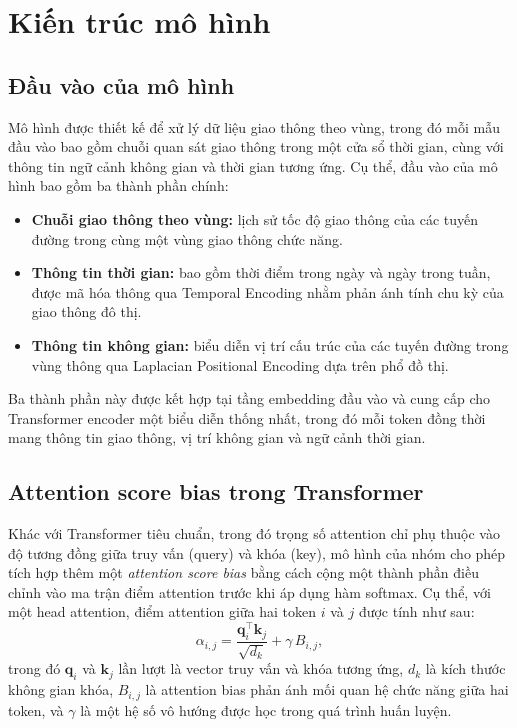 \section{Kiến trúc mô hình}
\label{sec:model}

\subsection{Đầu vào của mô hình}
\label{subsec:model_input}

Mô hình được thiết kế để xử lý dữ liệu giao thông theo vùng, trong đó mỗi mẫu đầu vào bao gồm
chuỗi quan sát giao thông trong một cửa sổ thời gian, cùng với thông tin ngữ cảnh không gian
và thời gian tương ứng. Cụ thể, đầu vào của mô hình bao gồm ba thành phần chính:

\begin{itemize}
    \item \textbf{Chuỗi giao thông theo vùng:} lịch sử tốc độ giao thông của các tuyến đường
    trong cùng một vùng giao thông chức năng.
    \item \textbf{Thông tin thời gian:} bao gồm thời điểm trong ngày và ngày trong tuần,
    được mã hóa thông qua Temporal Encoding nhằm phản ánh tính chu kỳ của giao thông đô thị.
    \item \textbf{Thông tin không gian:} biểu diễn vị trí cấu trúc của các tuyến đường trong vùng
    thông qua Laplacian Positional Encoding dựa trên phổ đồ thị.
\end{itemize}

Ba thành phần này được kết hợp tại tầng embedding đầu vào và cung cấp cho Transformer encoder
một biểu diễn thống nhất, trong đó mỗi token đồng thời mang thông tin giao thông, vị trí không
gian và ngữ cảnh thời gian.

\subsection{Attention score bias trong Transformer}
\label{subsec:attention_bias}

Khác với Transformer tiêu chuẩn, trong đó trọng số attention chỉ phụ thuộc vào độ tương đồng
giữa truy vấn (query) và khóa (key), mô hình của nhóm cho phép tích hợp thêm một
\textit{attention score bias} bằng cách cộng một thành phần điều chỉnh vào ma trận điểm
attention trước khi áp dụng hàm softmax. Cụ thể, với một head attention, điểm attention giữa
hai token $i$ và $j$ được tính như sau:
\begin{equation}
\alpha_{i,j}
=
\frac{
\mathbf{q}_i^\top \mathbf{k}_j
}{
\sqrt{d_k}
}
+
\gamma \, B_{i,j},
\end{equation}
trong đó $\mathbf{q}_i$ và $\mathbf{k}_j$ lần lượt là vector truy vấn và khóa tương ứng,
$d_k$ là kích thước không gian khóa, $B_{i,j}$ là attention bias phản ánh mối quan hệ chức
năng giữa hai token, và $\gamma$ là một hệ số vô hướng được học trong quá trình huấn luyện.

